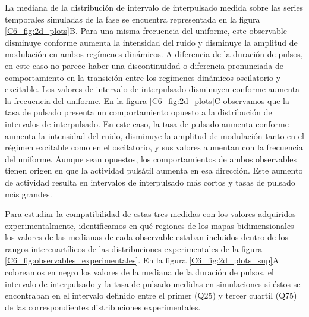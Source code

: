 \documentclass[./main.tex]{subfiles}
\begin{document}
La mediana de la distribución de intervalo de interpulsado medida sobre las series temporales simuladas de la fase se encuentra representada en la figura \ref{C6_fig:2d_plots}B. Para una misma frecuencia del uniforme, este observable disminuye conforme aumenta la intensidad del ruido y disminuye la amplitud de modulación en ambos regímenes dinámicos. A diferencia de la duración de pulsos, en este caso no parece haber una discontinuidad o diferencia pronunciada de comportamiento en la transición entre los regímenes dinámicos oscilatorio y excitable. Los valores de intervalo de interpulsado disminuyen conforme aumenta la frecuencia del uniforme. En la figura \ref{C6_fig:2d_plots}C observamos que la tasa de pulsado presenta un comportamiento opuesto a la distribución de intervalos de interpulsado. En este caso, la tasa de pulsado aumenta conforme aumenta la intensidad del ruido, disminuye la amplitud de modulación tanto en el régimen excitable como en el oscilatorio, y sus valores aumentan con la frecuencia del uniforme. Aunque sean opuestos, los comportamientos de ambos observables tienen origen en que la actividad pulsátil aumenta en esa dirección. Este aumento de actividad resulta en intervalos de interpulsado más cortos y tasas de pulsado más grandes. 


Para estudiar la compatibilidad de estas tres medidas con los valores adquiridos experimentalmente, identificamos en qué regiones de los mapas bidimensionales los valores de las medianas de cada observable estaban incluidos dentro de los rangos intercuartílicos de las distribuciones experimentales de la figura \ref{C6_fig:observables_experimentales}. En la figura \ref{C6_fig:2d_plots_sup}A coloreamos en negro los valores de la mediana de la duración de pulsos, el intervalo de interpulsado y la tasa de pulsado medidas en simulaciones si éstos se encontraban en el intervalo definido entre el primer (Q25) y tercer cuartil (Q75) de las correspondientes distribuciones experimentales.
\end{document}
